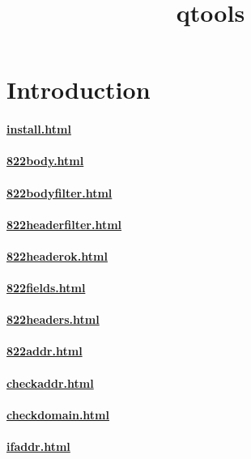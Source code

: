 \documentclass{book}
\title{qtools}
\begin{document}
\section{Introduction}

\paragraph{\href{How to install qtools}{install.html}}

\paragraph{\href{The \cmd{822body} program}{822body.html}}
\paragraph{\href{The \cmd{822bodyfilter} program}{822bodyfilter.html}}
\paragraph{\href{The \cmd{822headerfilter} program}{822headerfilter.html}}
\paragraph{\href{The \cmd{822headerok} program}{822headerok.html}}

\paragraph{\href{The \cmd{822fields} program}{822fields.html}}
\paragraph{\href{The \cmd{822headers} program}{822headers.html}}

\paragraph{\href{The \cmd{822addr} program}{822addr.html}}
\paragraph{\href{The \cmd{checkaddr} program}{checkaddr.html}}
\paragraph{\href{The \cmd{checkdomain} program}{checkdomain.html}}
\paragraph{\href{The \cmd{ifaddr} program}{ifaddr.html}}
\end{document}
